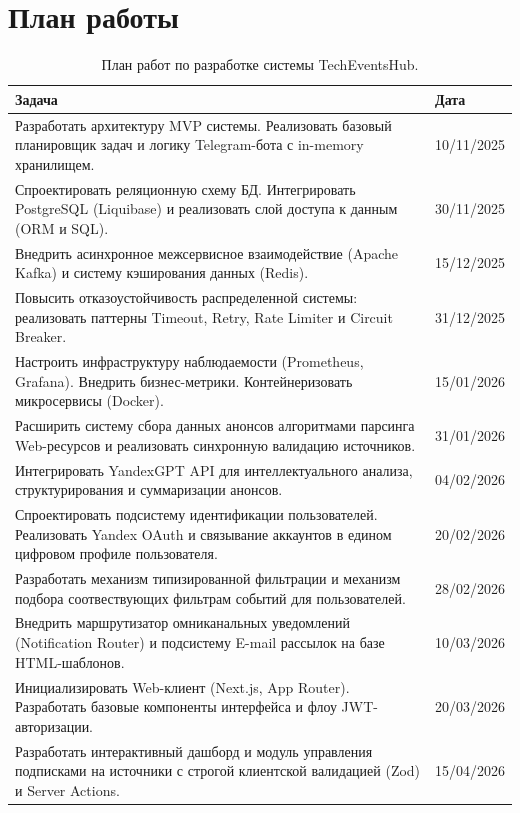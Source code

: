 \section*{План работы}

\begin{table}[h!]
\caption{План работ по разработке системы TechEventsHub.}
\label{tab:work_plan}
\begin{tabular}{|m{28em} | m{5em}|}
\hline
\textbf{Задача} & \textbf{Дата}\\
\hline
\hline
 Разработать архитектуру MVP системы. Реализовать базовый планировщик задач и логику Telegram-бота с in-memory хранилищем. & 10/11/2025 \\
\hline
 Спроектировать реляционную схему БД. Интегрировать PostgreSQL (Liquibase) и реализовать слой доступа к данным (ORM и SQL). & 30/11/2025 \\
\hline
 Внедрить асинхронное межсервисное взаимодействие (Apache Kafka) и систему кэширования данных (Redis). & 15/12/2025 \\
\hline
 Повысить отказоустойчивость распределенной системы: реализовать паттерны Timeout, Retry, Rate Limiter и Circuit Breaker. & 31/12/2025 \\
\hline
 Настроить инфраструктуру наблюдаемости (Prometheus, Grafana). Внедрить бизнес-метрики. Контейнеризовать микросервисы (Docker). & 15/01/2026 \\
\hline
 Расширить систему сбора данных анонсов алгоритмами парсинга Web-ресурсов и реализовать синхронную валидацию источников. & 31/01/2026 \\
\hline
 Интегрировать YandexGPT API для интеллектуального анализа, структурирования и суммаризации анонсов. & 04/02/2026 \\
\hline
 Спроектировать подсистему идентификации пользователей. Реализовать Yandex OAuth и связывание аккаунтов в едином цифровом профиле пользователя. & 20/02/2026 \\
\hline
 Разработать механизм типизированной фильтрации и механизм подбора соотвествующих фильтрам событий для пользователей. & 28/02/2026 \\
\hline
 Внедрить маршрутизатор омниканальных уведомлений (Notification Router) и подсистему E-mail рассылок на базе HTML-шаблонов. & 10/03/2026 \\
\hline
 Инициализировать Web-клиент (Next.js, App Router). Разработать базовые компоненты интерфейса и флоу JWT-авторизации. & 20/03/2026 \\
\hline
 Разработать интерактивный дашборд и модуль управления подписками на источники с строгой клиентской валидацией (Zod) и Server Actions. & 15/04/2026 \\
\hline
\end{tabular}
\end{table}
